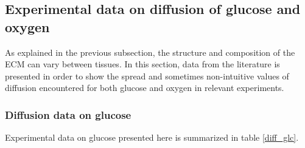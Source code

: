 \documentclass[11pt,a4paper]{article}
\begin{document}
\subsection{Experimental data on diffusion of glucose and oxygen}
As explained in the previous subsection, the structure and composition of the ECM can vary between tissues. In this section, data from the literature is presented in order to show the spread and sometimes non-intuitive values of diffusion encountered for both glucose and oxygen in relevant experiments.\\

\subsubsection{Diffusion data on glucose}

Experimental data on glucose presented here is summarized in table \ref{diff_glc}.
\end{document}
